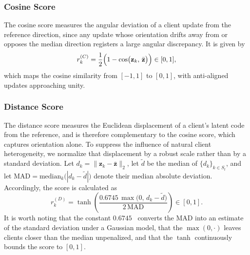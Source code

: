 \documentclass[journal]{IEEEtran}
\begin{document}
\subsubsection{Cosine Score}
The cosine score measures the angular deviation of a client update from the reference direction, since any update whose orientation drifts away from or opposes the median direction registers a large angular discrepancy. It is given by
\begin{equation}
r_k^{(C)} = \frac{1}{2}\Bigl(1 - \cos\bigl(\mathbf{z}_k,\, \bar{\mathbf{z}}\bigr)\Bigr) \in [0,1],
\label{eq:cos_score}
\end{equation}
which maps the cosine similarity from $[-1,1]$ to $[0,1]$, with anti-aligned updates approaching unity.

\subsubsection{Distance Score}
The distance score measures the Euclidean displacement of a client's latent code from the reference, and is therefore complementary to the cosine score, which captures orientation alone. To suppress the influence of natural client heterogeneity, we normalize that displacement by a robust scale rather than by a standard deviation. Let $d_k = \|\mathbf{z}_k - \bar{\mathbf{z}}\|_2$, let $\tilde{d}$ be the median of $\{d_k\}_{k \in S_t}$, and let $\mathrm{MAD} = \mathrm{median}_k\bigl(|d_k - \tilde{d}|\bigr)$ denote their median absolute deviation. Accordingly, the score is calculated as
\begin{equation}
r_k^{(D)} = \tanh\!\left(\frac{0.6745\,\max\bigl(0,\, d_k - \tilde{d}\bigr)}{2\,\mathrm{MAD}}\right) \in [0,1].
\label{eq:dist_score}
\end{equation}
It is worth noting that the constant $0.6745$~\cite{nist_modified_zscore} converts the MAD into an estimate of the standard deviation under a Gaussian model, that the $\max(0,\cdot)$ leaves clients closer than the median unpenalized, and that the $\tanh$ continuously bounds the score to $[0,1]$.
\end{document}
